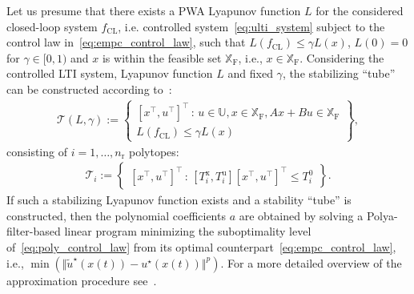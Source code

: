 \documentclass[letterpaper, 10 pt, conference]{ieeeconf}
\begin{document}
	Let us presume that there exists a PWA Lyapunov function $L$ for the considered closed-loop system $f_{\mathrm{CL}}$, i.e. controlled system~\eqref{eq:ulti_system} subject to the control law in~\eqref{eq:empc_control_law}, such that $L(f_{\mathrm{CL}}) \le \gamma L(x)$, $L(0) = 0$ for $\gamma \in [0,1)$ and $x$ is within the feasible set $\mathbb{X}_{\mathrm{F}}$, i.e., $x \in \mathbb{X}_{\mathrm{F}}$. Considering the controlled LTI system, Lyapunov function $L$ and fixed $\gamma$, the stabilizing ``tube'' can be constructed according to~\cite{tube_FCh}:
	\begin{eqnarray}
		\label{eq:stab_tube}
		\mathcal{T}(L, \gamma) := \begin{Bmatrix}
			[x^\top, u^\top]^\top \, : \, u \in \mathbb{U}, x \in \mathbb{X}_{\mathrm{F}} , A x + B u \in \mathbb{X}_{\mathrm{F}} \\
			L(f_{\mathrm{CL}}) \le \gamma L(x)
		\end{Bmatrix} \! , \nonumber 
	\end{eqnarray}
	consisting of $i = 1, \dots, n_\mathrm{r}$ polytopes:
	\begin{eqnarray}
		\label{eq:stab_tube_polytope}
		\mathcal{T}_i := \begin{Bmatrix}
			[x^\top, u^\top]^\top \, : \, [T_i^{\mathrm{x}}, T_i^{\mathrm{u}}] [x^\top, u^\top]^\top \le T_i^0		
		\end{Bmatrix}. 
	\end{eqnarray}
	If such a stabilizing Lyapunov function exists and a stability ``tube'' is constructed, then the polynomial coefficients $a$ are obtained by solving a Polya-filter-based linear program minimizing the suboptimality level of~\eqref{eq:poly_control_law} from its optimal counterpart~\eqref{eq:empc_control_law}, i.e., $\min(\Vert\widetilde{u}^{\star}(x(t))-	u^{\star}(x(t))\Vert^{p})$. For a more detailed overview of the approximation procedure see~\cite{kvasnica_polynomial}.
	
	
\end{document}
